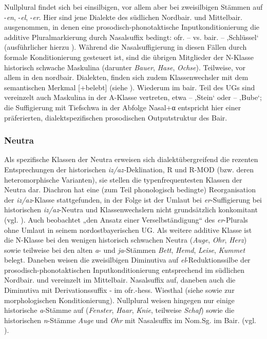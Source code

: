 Nullplural findet sich bei einsilbigen, vor allem aber bei zweisilbigen Stämmen auf -\textit{en}, -\textit{el}, -\textit{er}. Hier sind jene Dialekte des südlichen Nordbair. und Mittelbair. ausgenommen, in denen eine prosodisch-phonotaktische Inputkonditionierung die additive Pluralmarkierung durch Nasalsuffix bedingt: ofr.  --  vs. bair.  --  ‚Schlüssel‘ (ausführlicher hierzu ). Während die Nasalsuffigierung in diesen Fällen durch formale Konditionierung gesteuert ist, sind die übrigen Mitglieder der N-Klasse historisch schwache Maskulina (darunter \textit{Bauer}, \textit{Hase}, \textit{Ochse}). Teilweise, vor allem in den nordbair. Dialekten, finden sich zudem Klassenwechsler mit dem semantischen Merkmal [+belebt] (siehe ). Wiederum im bair. Teil des UGs sind vereinzelt auch Maskulina in der A-Klasse vertreten, etwa  --  ‚Stein‘ oder  --  ‚Bube‘; die Suffigierung mit Tiefschwa in der Abfolge Nasal+α entspricht hier einer präferierten, dialektspezifischen prosodischen Outputstruktur des Bair.

\subsubsection{Neutra}
\label{sec:8.3.1.2}
Als spezifische Klassen der Neutra erweisen sich dialektübergreifend die rezenten Entsprechungen der historischen \textit{iz/az-}Deklination, R und R-MOD (bzw. deren heteromorphische Varianten), sie stellen die typenfrequentesten Klassen der Neutra dar. Diachron hat eine (zum Teil phonologisch bedingte) Reorganisation der \textit{iz/az}{}-Klasse stattgefunden, in der Folge ist der Umlaut bei \textit{er}{}-Suffigierung bei historischen \textit{iz/az}{}-Neutra und Klassenwechslern nicht grundsätzlich konkomitant (vgl. ). Auch \citet[163]{Rowley1997} beobachtet „den Ansatz einer Verselbständigung“ des \textit{er}{}-Plurals ohne Umlaut in seinem nordostbayerischen UG. Als weitere additive Klasse ist die N-Klasse bei den wenigen historisch schwachen Neutra (\textit{Auge}, \textit{Ohr}, \textit{Herz}) sowie teilweise bei den alten \textit{a}{}- und \textit{ja}{}-Stämmen \textit{Bett}, \textit{Hemd}, \textit{Leise}, \textit{Kummet} belegt. Daneben weisen die zweisilbigen Diminutiva auf \textit{el}{}-Reduktionssilbe der prosodisch-phonotaktischen Inputkonditionierung entsprechend im südlichen Nordbair. und vereinzelt im Mittelbair. Nasalsuffix auf, daneben auch die Diminutiva mit Derivationssuffix - im ofr.-hess. Wiesthal (siehe  sowie  zur morphologischen Konditionierung). Nullplural weisen hingegen nur einige historische \textit{a}{}-Stämme auf (\textit{Fenster}, \textit{Haar}, \textit{Knie}, teilweise \textit{Schaf}) sowie die historischen \textit{n}{}-Stämme \textit{Auge} und \textit{Ohr} mit Nasalsuffix im Nom.Sg. im Bair. (vgl. ).

